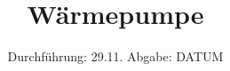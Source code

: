 

\subject{V206}
\title{Wärmepumpe}
\date{%
  Durchführung: 29.11.
  \hspace{3em}
  Abgabe: DATUM
}


\setlength{\parindent}{0pt} %

\maketitle
\thispagestyle{empty}
\tableofcontents
\newpage







\printbibliography{}


